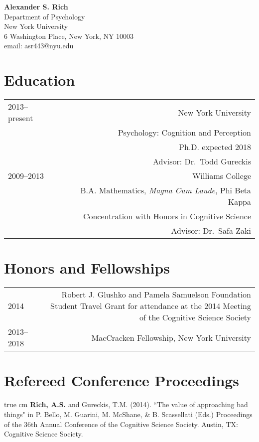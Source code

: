 \documentclass[12pt]{my_cv}
\def\ind{\hangindent=1 true cm\hangafter=1 \noindent}
\begin{document}
\noindent \textbf{\sffamily\Large Alexander S. Rich}\vspace{1em}\\
Department of Psychology\\
New York University\\
6 Washington Place, New York, NY 10003\\
email: asr443@nyu.edu\\

\section{Education}
\begin{tabular}{L R}
2013--present&New York University\\
&Psychology: Cognition and Perception\\
&Ph.D. expected 2018\\
&Advisor: Dr.\ Todd Gureckis \vspace{1em}\\ 
2009--2013&Williams College\\
&B.A. Mathematics, \emph{Magna Cum Laude}, Phi Beta Kappa\\
&Concentration with Honors in Cognitive Science\\
&Advisor: Dr.\ Safa Zaki\\
\end{tabular}

\section{Honors and Fellowships}
\begin{tabular}{L R}
2014&Robert J. Glushko and Pamela Samuelson Foundation Student Travel Grant for attendance at the 2014 Meeting of the Cognitive Science Society\\[1ex]
2013--2018&MacCracken Fellowship, New York University\\
\end{tabular}

\section{Refereed Conference Proceedings}
\ind \textbf{Rich, A.S.} and Gureckis, T.M. (2014). ``The value of approaching bad things" in P. Bello, M. Guarini, M. McShane, \& B. Scassellati (Eds.) Proceedings of the 36th Annual Conference of the Cognitive Science Society. Austin, TX: Cognitive Science Society.	
\end{document}
